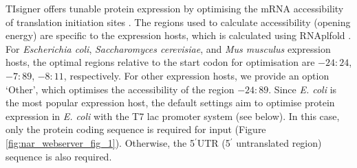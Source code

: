 TIsigner offers tunable protein expression by optimising the mRNA
accessibility of translation initiation sites
\cite{bhandari2019highly}. The regions used to
calculate accessibility (opening energy) are specific to the expression
hosts, which is calculated using RNAplfold
\cite{Bernhart2006-ma,Bernhart2011-cc,Lorenz2011-rg}. For
\emph{Escherichia coli}, \emph{Saccharomyces cerevisiae}, and \emph{Mus
musculus} expression hosts, the optimal regions relative to the start
codon for optimisation are $-24:24$, $-7:89$, $-8:11$, respectively. For other
expression hosts, we provide an option `Other', which optimises the
accessibility of the region $−24:89$. Since \emph{E. coli} is the most
popular expression host, the default settings aim to optimise protein
expression in \emph{E. coli} with the T7 lac promoter system (see
below). In this case, only the protein coding sequence is required for
input (Figure \ref{fig:nar_webserver_fig_1}). Otherwise, the 5$^{\prime}$UTR (5$^{\prime}$ 
untranslated region) sequence is also required.



